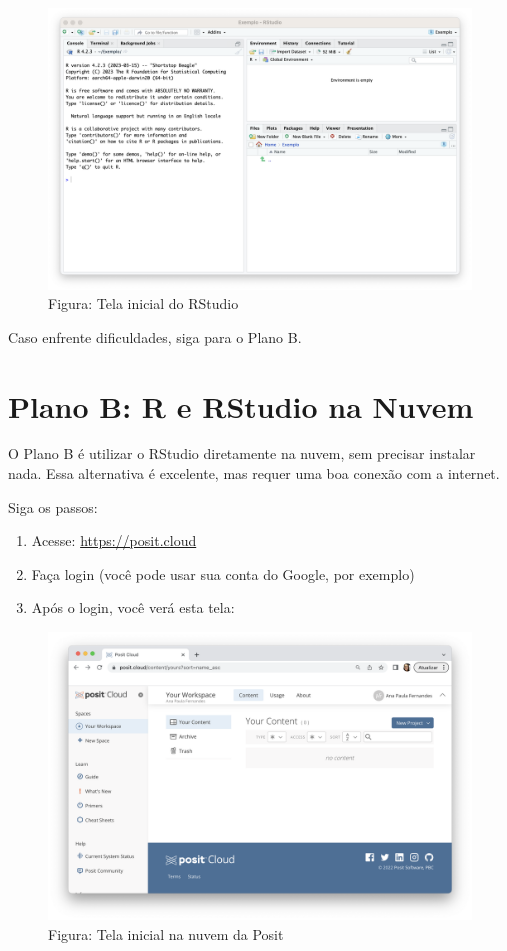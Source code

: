 \documentclass[
]{book}
\providecommand{\tightlist}{%
  \setlength{\itemsep}{0pt}\setlength{\parskip}{0pt}}
\begin{document}
\begin{figure}
\centering
\includegraphics{telaRStudio.png}
\caption{Figura: Tela inicial do RStudio}
\end{figure}

Caso enfrente dificuldades, siga para o Plano B.

\section{Plano B: R e RStudio na Nuvem}\label{plano-b-r-e-rstudio-na-nuvem}

O Plano B é utilizar o RStudio diretamente na nuvem, sem precisar instalar nada. Essa alternativa é excelente, mas requer uma boa conexão com a internet.

Siga os passos:

\begin{enumerate}
\def\labelenumi{\arabic{enumi}.}
\tightlist
\item
  Acesse: \url{https://posit.cloud}
\item
  Faça login (você pode usar sua conta do Google, por exemplo)
\item
  Após o login, você verá esta tela:
\end{enumerate}

\begin{figure}
\centering
\includegraphics{telaPosit.png}
\caption{Figura: Tela inicial na nuvem da Posit}
\end{figure}
\end{document}
